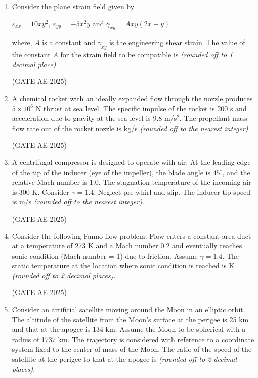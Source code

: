 \documentclass[journal,12pt,onecolumn]{IEEEtran}
\theoremstyle{remark}
\begin{document}
\begin{flushleft}
\begin{enumerate}
\item Consider the plane strain field given by  

\begin{center}
    $\varepsilon_{xx} = 10xy^2$, \quad $\varepsilon_{yy} = -5x^2y$ \quad and \quad $\gamma_{xy} = Axy(2x-y)$ 
\end{center}

where, $A$ is a constant and $\gamma_{xy}$ is the engineering shear strain. The value of the constant $A$ for the strain field to be compatible is \underline{\hspace{3cm}} \textit{(rounded off to 1 decimal place)}.

\hfill (GATE AE 2025)

\item A chemical rocket with an ideally expanded flow through the nozzle produces $5\times 10^6$ N thrust at sea level. The specific impulse of the rocket is 200 s and acceleration due to gravity at the sea level is 9.8 m/s$^2$. The propellant mass flow rate out of the rocket nozzle is \underline{\hspace{3cm}} kg/s \textit{(rounded off to the nearest integer)}.

\hfill (GATE AE 2025)

\item A centrifugal compressor is designed to operate with air. At the leading edge of the tip of the inducer (eye of the impeller), the blade angle is $45^\circ$, and the relative Mach number is 1.0. The stagnation temperature of the incoming air is 300 K. Consider $\gamma = 1.4$. Neglect pre-whirl and slip. The inducer tip speed is \underline{\hspace{3cm}} m/s \textit{(rounded off to the nearest integer)}.

\hfill (GATE AE 2025)

\item Consider the following Fanno flow problem: Flow enters a constant area duct at a temperature of 273 K and a Mach number 0.2 and eventually reaches sonic condition (Mach number = 1) due to friction. Assume $\gamma = 1.4$. The static temperature at the location where sonic condition is reached is \underline{\hspace{3cm}} K \textit{(rounded off to 2 decimal places)}.

\hfill (GATE AE 2025)

\item Consider an artificial satellite moving around the Moon in an elliptic orbit. The altitude of the satellite from the Moon's surface at the perigee is 25 km and that at the apogee is 134 km. Assume the Moon to be spherical with a radius of 1737 km. The trajectory is considered with reference to a coordinate system fixed to the center of mass of the Moon. The ratio of the speed of the satellite at the perigee to that at the apogee is \underline{\hspace{3cm}} \textit{(rounded off to 2 decimal places)}.


\end{enumerate}
\end{flushleft}
\end{document}
